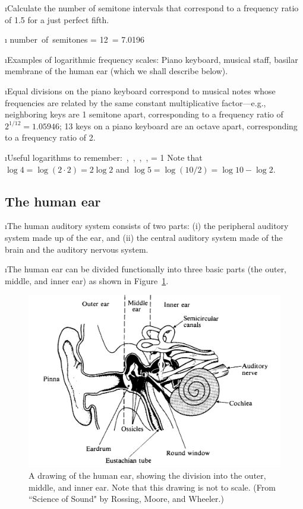 \i \exer Calculate the number of semitone intervals
that correspond to a frequency ratio of 1.5 for 
a just perfect fifth.

\i \ans
%
\be
{\rm number\ of\ semitones}
= 12\, 
= 7.0196
\ee

\i Examples of logarithmic frequency scales:
Piano keyboard, musical staff, basilar membrane of the
human ear (which we shall describe below).

\i Equal divisions on the piano keyboard 
correspond to musical notes whose frequencies are related
by the same constant multiplicative factor---e.g., 
neighboring keys are 1 semitone apart, corresponding
to a frequency ratio of $2^{1/12}=1.05946$;
13 keys on a piano keyboard are an octave apart, 
corresponding to a frequency ratio of 2.

\i Useful logarithms to remember:
%
\be
{} \,,\quad
{} \,,\quad
{} \,,\quad
{} \,,\quad
{} = 1
\ee
%
Note that $\log 4 = \log(2\cdot 2) = 2\log 2$ and
$\log 5 = \log(10/2) = \log 10-\log 2$.

\ei
\subsection{The human ear}
\bi

\i The human auditory system consists of two parts: 
(i) the peripheral auditory system made up of the ear, and
(ii) the central auditory system made of the brain and the
auditory nervous system.

\i The human ear can be divided functionally into 
three basic parts
(the outer, middle, and inner ear) as shown in 
Figure~\ref{f:human-ear-diagram}.
%
\begin{figure}[htbp]
\begin{center}
\includegraphics[width=.8\textwidth]{human-ear-diagram.jpg}
\caption{A drawing of the human ear, showing the division into
the outer, middle, and inner ear.  
Note that this drawing is not to scale.
(From ``Science of Sound" by Rossing, Moore, and Wheeler.)}
\label{f:human-ear-diagram}
\end{center}
\end{figure}
%

